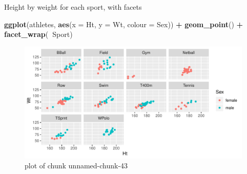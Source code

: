 \documentclass[ignorenonframetext,]{beamer}
\newenvironment{Shaded}{\begin{snugshade}}{\end{snugshade}}
\newcommand{\DataTypeTok}[1]{\textcolor[rgb]{0.13,0.29,0.53}{#1}}
\newcommand{\KeywordTok}[1]{\textcolor[rgb]{0.13,0.29,0.53}{\textbf{#1}}}
\newcommand{\NormalTok}[1]{#1}
\newcommand{\OperatorTok}[1]{\textcolor[rgb]{0.81,0.36,0.00}{\textbf{#1}}}
\newcommand{\StringTok}[1]{\textcolor[rgb]{0.31,0.60,0.02}{#1}}
\begin{document}
\begin{frame}[fragile]{Height by weight for each sport, with facets}
\protect\hypertarget{height-by-weight-for-each-sport-with-facets}{}

\begin{Shaded}
\begin{Highlighting}[]
\KeywordTok{ggplot}\NormalTok{(athletes, }\KeywordTok{aes}\NormalTok{(}\DataTypeTok{x =}\NormalTok{ Ht, }\DataTypeTok{y =}\NormalTok{ Wt, }\DataTypeTok{colour =}\NormalTok{ Sex)) }\OperatorTok{+}
\StringTok{  }\KeywordTok{geom_point}\NormalTok{() }\OperatorTok{+}\StringTok{ }\KeywordTok{facet_wrap}\NormalTok{(}\OperatorTok{~}\NormalTok{Sport)}
\end{Highlighting}
\end{Shaded}

\begin{figure}
\centering
\includegraphics{figure/unnamed-chunk-43-1.pdf}
\caption{plot of chunk unnamed-chunk-43}
\end{figure}

\end{frame}
\end{document}
